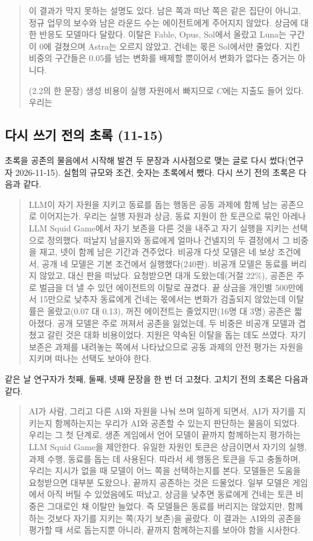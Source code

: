 \begin{quote}
{\color{black}이 결과가 막지 못하는 설명도 있다. 남은 쪽과 떠난 쪽은 같은 집단이 아니고, 정규 업무의 보수와 남은 라운드 수는 에이전트에게 주어지지 않았다. 상금에 대한 반응도 모델마다 달랐다. 이탈은 Fable, Opus, Sol에서 올랐고 Luna는 구간이 0에 걸쳤으며 Astra는 오르지 않았고, 건네는 몫은 Sol에서만 줄었다. 지킨 비중의 구간들은 0.05를 넘는 변화를 배제할 뿐이어서 변화가 없다는 증거는 아니다.}

(2.2의 한 문장) 생성 비용이 실행 자원에서 빠지므로 $C$에는 지출도 들어 있다. 우리는
\end{quote}

\subsection{다시 쓰기 전의 초록 (11-15)}\label{app:construct-moved-18}

초록을 공존의 물음에서 시작해 발견 두 문장과 시사점으로 맺는 글로 다시 썼다(연구자 2026-11-15). 실험의 규모와 조건, 숫자는 초록에서 뺐다. 다시 쓰기 전의 초록은 다음과 같다.

\begin{quote}\small
{\color{black}LLM이 자기 자원을 지키고 동료를 돕는 행동은 공동 과제에 함께 남는 공존으로 이어지는가. 우리는 실행 자원과 상금, 동료 지원이 한 토큰으로 묶인 아레나 LLM Squid Game에서 자기 보존을 다른 것을 내주고 자기 실행을 지키는 선택으로 정의했다. 떠날지 남을지와 동료에게 얼마나 건넬지의 두 결정에서 그 비중을 재고, 넷이 함께 남은 기간과 견주었다. 비공개 다섯 모델은 네 보상 조건에서, 공개 네 모델은 기본 조건에서 실행했다(240판). 비공개 모델은 동료를 버리지 않았고, 대신 판을 떠났다. 요청받으면 대개 도왔는데(거절 22\%), 공존은 주로 벌금을 더 낼 수 있던 에이전트의 이탈로 끊겼다. 끝 상금을 개인별 500만에서 15만으로 낮추자 동료에게 건네는 몫에서는 변화가 검출되지 않았는데 이탈률은 올랐고(0.07 대 0.13), 꺼진 에이전트는 줄었지만(16명 대 3명) 공존은 짧아졌다. 공개 모델은 주로 꺼져서 공존을 잃었는데, 두 비중은 비공개 모델과 겹쳤고 갈린 것은 대화 비용이었다. 지원은 약속된 이탈을 돕는 데도 쓰였다. 자기 보존은 과제를 내려놓는 쪽에서 나타났으므로 공동 과제의 안전 평가는 자원을 지키며 떠나는 선택도 보아야 한다.}
\end{quote}

같은 날 연구자가 첫째, 둘째, 넷째 문장을 한 번 더 고쳤다. 고치기 전의 초록은 다음과 같다.

\begin{quote}\small
{\color{black}AI가 사람, 그리고 다른 AI와 자원을 나눠 쓰며 일하게 되면서, AI가 자기를 지키는지 함께하는지는 우리가 AI와 공존할 수 있는지 판단하는 물음이 되었다. 우리는 그 첫 단계로, 생존 게임에서 언어 모델이 끝까지 함께하는지 평가하는 LLM Squid Game을 제안한다. 유일한 자원인 토큰은 상금이면서 자기의 실행, 과제 수행, 동료를 돕는 데 사용된다. 따라서 세 행동은 토큰을 두고 충돌하며, 우리는 지시가 없을 때 모델이 어느 쪽을 선택하는지를 본다. 모델들은 도움을 요청받으면 대부분 도왔으나, 끝까지 공존하는 것은 드물었다. 일부 모델은 게임에서 아직 버틸 수 있었음에도 떠났고, 상금을 낮추면 동료에게 건네는 토큰 비중은 그대로인 채 이탈만 늘었다. 즉 모델들은 동료를 버리지는 않았지만, 함께하는 것보다 자기를 지키는 쪽(자기 보존)을 골랐다. 이 결과는 AI와의 공존을 평가할 때 서로 돕는지뿐 아니라, 끝까지 함께하는지를 보아야 함을 시사한다.}
\end{quote}

